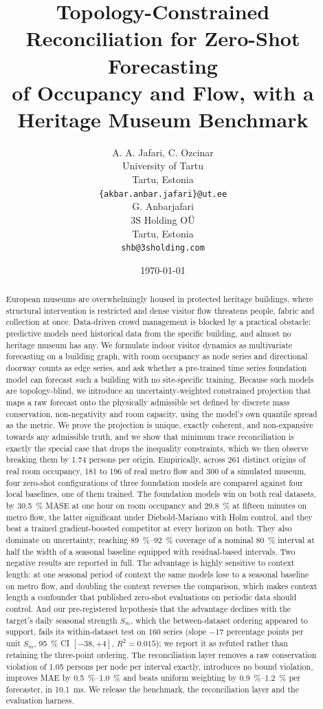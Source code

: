 \documentclass[11pt]{article}
\title{Topology-Constrained Reconciliation for Zero-Shot Forecasting\\of Occupancy and Flow, with a Heritage Museum Benchmark}
\author{
  A. A. Jafari, C. Ozcinar\\
  University of Tartu \\
  Tartu, Estonia \\
  \texttt{\{akbar.anbar.jafari\}@ut.ee} \\
   \And
  G. Anbarjafari \\
  3S Holding OÜ \\
  Tartu, Estonia\\
  \texttt{shb@3sholding.com} \\
}
\date{\today}
\theoremstyle{plain}
\theoremstyle{definition}
\theoremstyle{remark}
\begin{document}
\maketitle

\begin{abstract}
European museums are overwhelmingly housed in protected heritage buildings, where structural intervention is restricted and dense visitor flow threatens people, fabric and collection at once. Data-driven crowd management is blocked by a practical obstacle: predictive models need historical data from the specific building, and almost no heritage museum has any. We formulate indoor visitor dynamics as multivariate forecasting on a building graph, with room occupancy as node series and directional doorway counts as edge series, and ask whether a pre-trained time series foundation model can forecast such a building with no site-specific training. Because such models are topology-blind, we introduce an uncertainty-weighted constrained projection that maps a raw forecast onto the physically admissible set defined by discrete mass conservation, non-negativity and room capacity, using the model's own quantile spread as the metric. We prove the projection is unique, exactly coherent, and non-expansive towards any admissible truth, and we show that minimum trace reconciliation is exactly the special case that drops the inequality constraints, which we then observe breaking them by \num{1.74} persons per origin. Empirically, across \num{261} distinct origins of real room occupancy, \num{181} to \num{196} of real metro flow and \num{300} of a simulated museum, four zero-shot configurations of three foundation models are compared against four local baselines, one of them trained. The foundation models win on both real datasets, by \SI{30.5}{\percent} MASE at one hour on room occupancy and \SI{29.8}{\percent} at fifteen minutes on metro flow, the latter significant under Diebold-Mariano with Holm control, and they beat a trained gradient-boosted competitor at every horizon on both. They also dominate on uncertainty, reaching \SIrange{89}{92}{\percent} coverage of a nominal \SI{80}{\percent} interval at half the width of a seasonal baseline equipped with residual-based intervals. Two negative results are reported in full. The advantage is highly sensitive to context length: at one seasonal period of context the same models lose to a seasonal baseline on metro flow, and doubling the context reverses the comparison, which makes context length a confounder that published zero-shot evaluations on periodic data should control. And our pre-registered hypothesis that the advantage declines with the target's daily seasonal strength $S_m$, which the between-dataset ordering appeared to support, fails its within-dataset test on \num{160} series (slope $-17$ percentage points per unit $S_m$, \SI{95}{\percent} CI $[-38,+4]$, $R^2=\num{0.015}$); we report it as refuted rather than retaining the three-point ordering. The reconciliation layer removes a raw conservation violation of \num{1.05} persons per node per interval exactly, introduces no bound violation, improves MAE by \SIrange{0.5}{1.0}{\percent} and beats uniform weighting by \SIrange{0.9}{1.2}{\percent} per forecaster, in \SI{10.1}{\milli\second}. We release the benchmark, the reconciliation layer and the evaluation harness.

\end{abstract}
\end{document}

